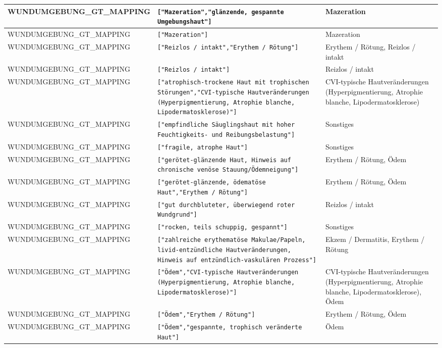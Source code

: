 \begin{longtable}{|p{3.5cm}|p{5cm}|p{6.5cm}|}
WUNDUMGEBUNG\_GT\_MAPPING & \texttt{["Mazeration","glänzende, gespannte Umgebungshaut"]} & Mazeration \\ \hline
WUNDUMGEBUNG\_GT\_MAPPING & \texttt{["Mazeration"]} & Mazeration \\ \hline
WUNDUMGEBUNG\_GT\_MAPPING & \texttt{["Reizlos / intakt","Erythem / Rötung"]} & Erythem / Rötung, Reizlos / intakt \\ \hline
WUNDUMGEBUNG\_GT\_MAPPING & \texttt{["Reizlos / intakt"]} & Reizlos / intakt \\ \hline
WUNDUMGEBUNG\_GT\_MAPPING & \texttt{["atrophisch-trockene Haut mit trophischen Störungen","CVI-typische Hautveränderungen (Hyperpigmentierung, Atrophie blanche, Lipodermatosklerose)"]} & CVI-typische Hautveränderungen (Hyperpigmentierung, Atrophie blanche, Lipodermatosklerose) \\ \hline
WUNDUMGEBUNG\_GT\_MAPPING & \texttt{["empfindliche Säuglingshaut mit hoher Feuchtigkeits- und Reibungsbelastung"]} & Sonstiges \\ \hline
WUNDUMGEBUNG\_GT\_MAPPING & \texttt{["fragile, atrophe Haut"]} & Sonstiges \\ \hline
WUNDUMGEBUNG\_GT\_MAPPING & \texttt{["gerötet-glänzende Haut, Hinweis auf chronische venöse Stauung/Ödemneigung"]} & Erythem / Rötung, Ödem \\ \hline
WUNDUMGEBUNG\_GT\_MAPPING & \texttt{["gerötet-glänzende, ödematöse Haut","Erythem / Rötung"]} & Erythem / Rötung, Ödem \\ \hline
WUNDUMGEBUNG\_GT\_MAPPING & \texttt{["gut durchbluteter, überwiegend roter Wundgrund"]} & Reizlos / intakt \\ \hline
WUNDUMGEBUNG\_GT\_MAPPING & \texttt{["rocken, teils schuppig, gespannt"]} & Sonstiges \\ \hline
WUNDUMGEBUNG\_GT\_MAPPING & \texttt{["zahlreiche erythematöse Makulae/Papeln, livid-entzündliche Hautveränderungen, Hinweis auf entzündlich-vaskulären Prozess"]} & Ekzem / Dermatitis, Erythem / Rötung \\ \hline
WUNDUMGEBUNG\_GT\_MAPPING & \texttt{["Ödem","CVI-typische Hautveränderungen (Hyperpigmentierung, Atrophie blanche, Lipodermatosklerose)"]} & CVI-typische Hautveränderungen (Hyperpigmentierung, Atrophie blanche, Lipodermatosklerose), Ödem \\ \hline
WUNDUMGEBUNG\_GT\_MAPPING & \texttt{["Ödem","Erythem / Rötung"]} & Erythem / Rötung, Ödem \\ \hline
WUNDUMGEBUNG\_GT\_MAPPING & \texttt{["Ödem","gespannte, trophisch veränderte Haut"]} & Ödem \\ \hline

\end{longtable}
